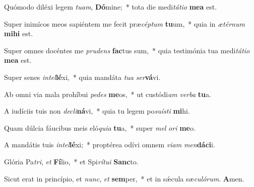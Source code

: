\item Quómodo diléxi legem \textit{tu}\textit{am}, \textbf{Dó}mine;~* tota die medi\textit{tá}\textit{ti}\textit{o} \textbf{me}\textbf{a} est.

\item Super inimícos meos sapiéntem me fecit præ\textit{cép}\textit{tum} \textbf{tu}um,~* quia in \textit{æ}\textit{tér}\textit{num} \textbf{mi}\textbf{hi} est.

\item Super omnes docéntes me \textit{pru}\textit{dens} \textbf{fac}tus sum,~* quia testimónia tua medi\textit{tá}\textit{ti}\textit{o} \textbf{me}\textbf{a} est.

\item Super senes \textit{in}\textit{tel}\textbf{lé}xi,~* quia mandáta \textit{tu}\textit{a} \textit{ser}\textbf{vá}vi.

\item Ab omni via mala prohíbui \textit{pe}\textit{des} \textbf{me}os,~* ut custódi\textit{am} \textit{ver}\textit{ba} \textbf{tu}a.

\item A iudíciis tuis non \textit{de}\textit{cli}\textbf{ná}vi,~* quia tu legem po\textit{su}\textit{ís}\textit{ti} \textbf{mi}hi.

\item Quam dúlcia fáucibus meis eló\textit{qui}\textit{a} \textbf{tu}a,~* super \textit{mel} \textit{o}\textit{ri} \textbf{me}o.

\item A mandátis tuis \textit{in}\textit{tel}\textbf{lé}xi;~* proptérea odívi omnem \textit{vi}\textit{am} \textit{men}\textbf{dá}\textbf{ci}i.

\item Glória Pa\textit{tri}, \textit{et} \textbf{Fí}lio,~* et Spi\textit{rí}\textit{tu}\textit{i} \textbf{Sanc}to.

\item Sicut erat in princípio, et \textit{nunc}, \textit{et} \textbf{sem}per,~* et in sǽcula sæ\textit{cu}\textit{ló}\textit{rum}. \textbf{A}men.
